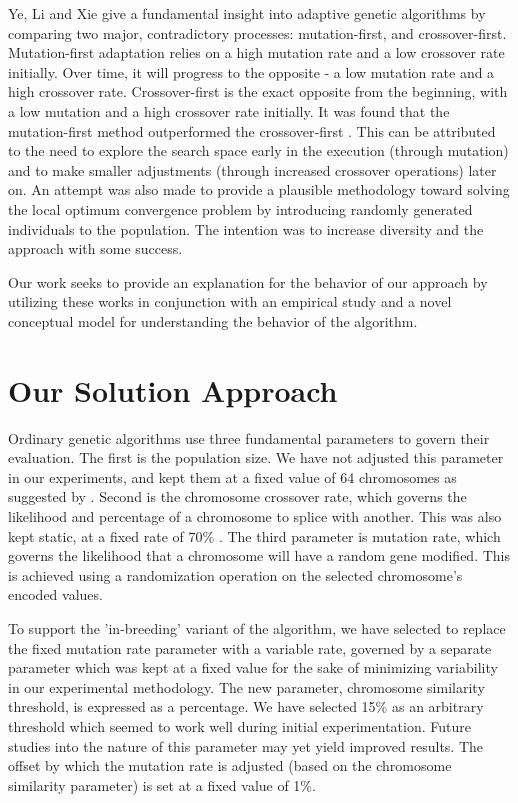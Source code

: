 \documentclass{sig-alternate}
\begin{document}
Ye, Li and Xie give a fundamental insight into adaptive genetic algorithms by comparing two major, contradictory processes: mutation-first, and crossover-first. Mutation-first adaptation relies on a high mutation rate and a low crossover rate initially. Over time, it will progress to the opposite - a low mutation rate and a high crossover rate. Crossover-first is the exact opposite from the beginning, with a low mutation and a high crossover rate initially. It was found that the mutation-first method outperformed the crossover-first \cite{ye2010some}. This can be attributed to the need to explore the search space early in the execution (through mutation) and to make smaller adjustments (through increased crossover operations) later on. An attempt was also made to provide a plausible methodology toward solving the local optimum convergence problem by introducing randomly generated individuals to the population. The intention was to increase diversity and the approach with some success. 

Our work seeks to provide an explanation for the behavior of our approach by utilizing these works in conjunction with an empirical study and a novel conceptual model for understanding the behavior of the algorithm.

% 
%
\section{Our Solution Approach}\label{params}
Ordinary genetic algorithms use three fundamental parameters to govern their evaluation. The first is the population size. We have not adjusted this parameter in our experiments, and kept them at a fixed value of 64 chromosomes as suggested by \cite{negnevitsky2005ai}. Second is the chromosome crossover rate, which governs the likelihood and percentage of a chromosome to splice with another. This was also kept static, at a fixed rate of 70\% \cite{negnevitsky2005ai}. The third parameter is mutation rate, which governs the likelihood that a chromosome will have a random gene modified. This is achieved using a randomization operation on the selected chromosome's encoded values.

To support the 'in-breeding' variant of the algorithm, we have selected to replace the fixed mutation rate parameter with a variable rate, governed by a separate parameter which was kept at a fixed value for the sake of minimizing variability in our experimental methodology. The new parameter, chromosome similarity threshold, is expressed as a percentage. We have selected 15\% as an arbitrary threshold which seemed to work well during initial experimentation. Future studies into the nature of this parameter may yet yield improved results. The offset by which the mutation rate is adjusted (based on the chromosome similarity parameter) is set at a fixed value of 1\%.
\end{document}
